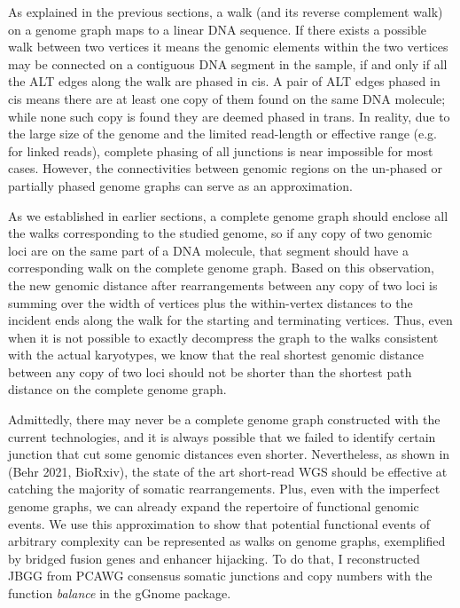 \documentclass[phd,tocprelim]{cornell}
\begin{document}
As explained in the previous sections, a walk (and its reverse complement walk) on a genome graph maps to a linear DNA sequence. If there exists a possible walk between two vertices it means the genomic elements within the two vertices may be connected on a contiguous DNA segment in the sample, if and only if all the ALT edges along the walk are phased in cis. A pair of ALT edges phased in cis means there are at least one copy of them found on the same DNA molecule; while none such copy is found they are deemed phased in trans. In reality, due to the large size of the genome and the limited read-length or effective range (e.g. for linked reads), complete phasing of all junctions is near impossible for most cases. However, the connectivities between genomic regions on the un-phased or partially phased genome graphs can serve as an approximation. 

As we established in earlier sections, a complete genome graph should enclose all the walks corresponding to the studied genome, so if any copy of two genomic loci are on the same part of a DNA molecule, that segment should have a corresponding walk on the complete genome graph. Based on this observation, the new genomic distance after rearrangements between any copy of two loci is summing over the width of vertices plus the within-vertex distances to the incident ends along the walk for the starting and terminating vertices. Thus, even when it is not possible to exactly decompress the graph to the walks consistent with the actual karyotypes, we know that the real shortest genomic distance between any copy of two loci should not be shorter than the shortest path distance on the complete genome graph.

Admittedly, there may never be a complete genome graph constructed with the current technologies, and it is always possible that we failed to identify certain junction that cut some genomic distances even shorter. Nevertheless, as shown in (Behr 2021, BioRxiv), the state of the art short-read WGS should be effective at catching the majority of somatic rearrangements. Plus, even with the imperfect genome graphs, we can already expand the repertoire of functional genomic events. We use this approximation to show that potential functional events of arbitrary complexity can be represented as walks on genome graphs, exemplified by bridged fusion genes and enhancer hijacking. To do that, I reconstructed JBGG from PCAWG consensus somatic junctions and copy numbers with the function \textit{balance} in the gGnome package.
\end{document}
